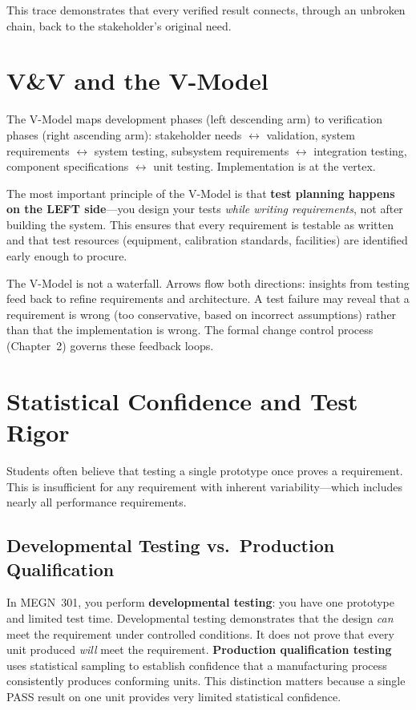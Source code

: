 \documentclass[11pt,letterpaper,twoside,openany]{book}
\begin{document}
This trace demonstrates that every verified result connects, through an unbroken chain, back to the stakeholder's original need.

\FloatBarrier
\section{V\&V and the V-Model}
The V-Model maps development phases (left descending arm) to verification phases (right ascending arm): stakeholder needs $\leftrightarrow$ validation, system requirements $\leftrightarrow$ system testing, subsystem requirements $\leftrightarrow$ integration testing, component specifications $\leftrightarrow$ unit testing. Implementation is at the vertex.

The most important principle of the V-Model is that \textbf{test planning happens on the LEFT side}---you design your tests \emph{while writing requirements}, not after building the system. This ensures that every requirement is testable as written and that test resources (equipment, calibration standards, facilities) are identified early enough to procure.

The V-Model is not a waterfall. Arrows flow both directions: insights from testing feed back to refine requirements and architecture. A test failure may reveal that a requirement is wrong (too conservative, based on incorrect assumptions) rather than that the implementation is wrong. The formal change control process (Chapter~2) governs these feedback loops.

\FloatBarrier
\section{Statistical Confidence and Test Rigor}
Students often believe that testing a single prototype once proves a requirement. This is insufficient for any requirement with inherent variability---which includes nearly all performance requirements.

\subsection{Developmental Testing vs.\ Production Qualification}
In MEGN~301, you perform \textbf{developmental testing}: you have one prototype and limited test time. Developmental testing demonstrates that the design \emph{can} meet the requirement under controlled conditions. It does not prove that every unit produced \emph{will} meet the requirement. \textbf{Production qualification testing} uses statistical sampling to establish confidence that a manufacturing process consistently produces conforming units. This distinction matters because a single PASS result on one unit provides very limited statistical confidence.
\end{document}
